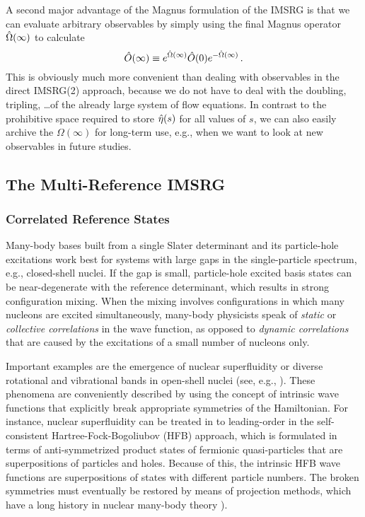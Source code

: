 {A second major advantage of the Magnus formulation of the IMSRG is that
we can evaluate arbitrary observables by simply using the final 
Magnus operator $\hat{\Omega}(\infty)$ to calculate
\begin{equation}
  \hat{O}(\infty)\equiv e^{\hat{\Omega}(\infty)}\hat{O}(0) e^{-\hat{\Omega}(\infty)}\,.
\end{equation}
This is obviously much more convenient than dealing with observables
in the direct IMSRG(2) approach, because we do not have to deal with
the doubling, tripling, \ldots of the already large system of flow
equations. In contrast to the prohibitive space required to store 
$\hat{\eta}(s)$ for all values of $s$, we can also easily archive the 
$\Omega(\infty)$ for long-term use, e.g., when we want to look at
new observables in future studies. 

\subsection{\label{sec:current_mrimsrg}The Multi-Reference IMSRG}


%
%
\subsubsection{Correlated Reference States}
Many-body bases built from a single Slater determinant and its particle-hole
excitations work best for systems with large gaps in the single-particle 
spectrum, e.g., closed-shell nuclei. If the gap is small, particle-hole 
excited basis states can be near-degenerate with the reference determinant, 
which results in strong configuration mixing. When the mixing involves 
configurations in which many nucleons are excited simultaneously, many-body 
physicists speak of \emph{static} or \emph{collective correlations} in the 
wave function, as opposed to \emph{dynamic correlations} that are caused by 
the excitations of a small number of nucleons only. 

Important examples are the emergence of nuclear superfluidity \cite{Dean:2003ei}
or diverse rotational and vibrational bands in open-shell nuclei (see, e.g., \cite{Bohr:1999vn}).
These phenomena are conveniently described by using the concept of intrinsic
wave functions that explicitly break appropriate symmetries of the Hamiltonian.
For instance, nuclear superfluidity can be treated in to leading-order in 
the self-consistent Hartree-Fock-Bogoliubov (HFB) approach, which is formulated 
in terms of anti-symmetrized product states of fermionic quasi-particles that 
are superpositions of particles and holes. Because of this, the intrinsic HFB wave 
functions are superpositions of states with different particle numbers. The
broken symmetries must eventually be restored by means of projection methods,
which have a long history in nuclear many-body theory
\cite{Peierls:1973fk,Ring:1980bb,Egido:1982sd,Robledo:1994qf,Flocard:1997fx,Sheikh:2000xx,Dobaczewski:2007hh,Bender:2009rv,Duguet:2009ph,Lacroix:2009aj,Lacroix:2012vn,Duguet:2015ye}).

}

